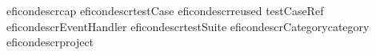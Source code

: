 \begin{gdreficon}
  \jb{}eficondescr{\gdstep}{cap}
  \jb{}eficondescr{\gdcase}{testCase}
  \jb{}eficondescr{reused \gdcase}{testCaseRef}
  \jb{}eficondescr{\gdehandler}{EventHandler}
  \jb{}eficondescr{\gdsuite}{testSuite}
  \jb{}eficondescr{Category}{category}
  \jb{}eficondescr{\gdproject}{project}
\end{gdreficon}












